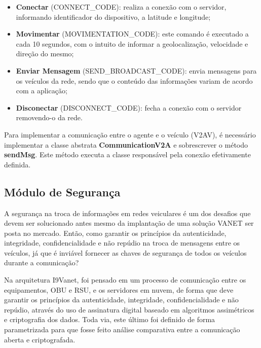\documentclass[
	12pt,				%
	oneside,			%
	a4paper,			%
	english,			%
	brazil				%
	]{abntex2ppgsi}
\begin{document}
\begin{itemize}
	\item{\textbf{Conectar} (CONNECT\_CODE): realiza a conexão com o servidor, informando identificador do dispositivo, a latitude e longitude;}	
	\item{\textbf{Movimentar} (MOVIMENTATION\_CODE): este comando é executado a cada 10 segundos, com o intuito de informar a geolocalização, velocidade e direção do mesmo;}	
	\item{\textbf{Enviar Mensagem} (SEND\_BROADCAST\_CODE): envia mensagens para os veículos da rede, sendo que o conteúdo das informações variam de acordo com a aplicação;}	
	\item{\textbf{Disconectar} (DISCONNECT\_CODE): fecha a conexão com o servidor removendo-o da rede.}	
\end{itemize} 

Para implementar a comunicação entre o agente e o veículo (V2AV), é necessário implementar a classe abstrata \textbf{CommunicationV2A} e sobrescrever o método \textbf{sendMsg}. Este método executa a classe responsável pela conexão efetivamente definida.


\subsection{Módulo de Segurança}


A segurança na troca de informações em redes veiculares é um dos desafios que devem ser solucionado antes mesmo da implantação de uma solução VANET ser posta no mercado. Então, como garantir os princípios da autenticidade, integridade, confidencialidade e  não repúdio na troca de mensagens entre os veículos, já que é inviável fornecer as chaves de segurança de todos os veículos durante a comunicação? 

Na arquitetura I9Vanet, foi pensado em um processo de comunicação entre os equipamentos, OBU e RSU, e os servidores em nuvem, de forma que deve garantir os princípios da autenticidade, integridade, confidencialidade e não repúdio, através do uso de assinatura digital baseado em algoritmos assimétricos e criptografia dos dados. Toda via, este último foi definido de forma parametrizada para que fosse feito análise comparativa entre a comunicação aberta e criptografada.
\end{document}
